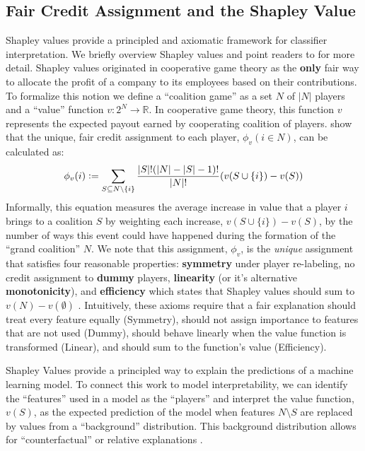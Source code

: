 \documentclass{article} %
\newcommand{\defeq}{\vcentcolon=}
\begin{document}
\vspace{-0.1in}
\subsection{Fair Credit Assignment and the Shapley Value}
\label{sec:shap-value}
\vspace{-.1in}
Shapley values provide a principled and axiomatic framework for classifier interpretation. We briefly overview Shapley values and point readers to \cite{molnar2020interpretable} for more detail. Shapley values originated in cooperative game theory as the \textbf{only} fair way to allocate the profit of a company to its employees based on their contributions. To formalize this notion we define a ``coalition game'' as a set $N$ of $|N|$ players and a ``value'' function $v: 2^N \to \mathbb{R}$. In cooperative game theory, this function $v$ represents the expected payout earned by cooperating coalition of players. \cite{shapley1951notes} show that the unique, fair credit assignment to each player, $\phi_v(i \in N)$, can be calculated as:
 \begin{equation}
    \label{eqn:shap}
     \phi_v(i) \defeq \sum_{S \subseteq N \setminus \{i\}} \frac{|S|! (|N|-|S|-1)!}{|N|!}(v(S \cup \{i\}) - v(S))
 \end{equation}
Informally, this equation measures the average increase in value that a player $i$ brings to a coalition $S$ by weighting each increase, $v(S \cup \{i\}) - v(S)$, by the number of ways this event could have happened during the formation of the ``grand coalition'' $N$. We note that this assignment, $\phi_v$, is the \textit{unique} assignment that satisfies four reasonable properties: \textbf{symmetry} under player re-labeling, no credit assignment to \textbf{dummy} players, \textbf{linearity} (or it's alternative \textbf{monotonicity}), and \textbf{efficiency} which states that Shapley values should sum to $v(N)-v(\emptyset)$ \citep{young1985monotonic}. Intuitively, these axioms require that a fair explanation should treat every feature equally (Symmetry), should not assign importance to features that are not used (Dummy), should behave linearly when the value function is transformed (Linear), and should sum to the function's value (Efficiency). 

Shapley Values provide a principled way to explain the predictions of a machine learning model. To connect this work to model interpretability, we can identify the ``features'' used in a model as the ``players'' and interpret the value function, $v(S)$, as the expected prediction of the model when features $N \setminus S$ are replaced by values from a ``background'' distribution. This background distribution allows for ``counterfactual'' or relative explanations \citep{goyal2019counterfactual}. 
\end{document}
